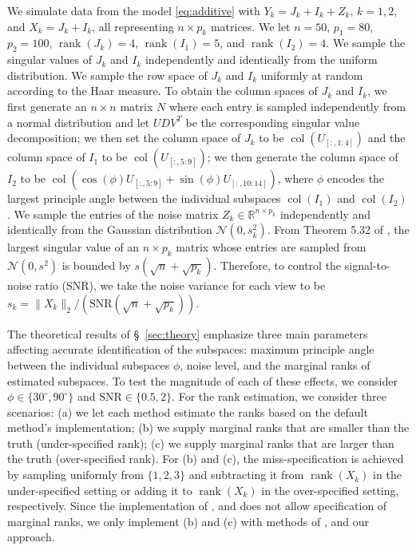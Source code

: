 \documentclass{amsart}
\DeclareMathOperator*{\col}{col}
\DeclareMathOperator*{\rank}{rank}
\newcommand{\Ncal}{\mathcal{N}}
\begin{document}
We simulate data from the model \eqref{eq:additive} with $Y_k = J_k + I_k + Z_k$, $k=1, 2$, and $X_k = J_k + I_k$, all representing $n \times p_k$ matrices. We let $n = 50$, $p_1 = 80$, $p_2 = 100$, $\rank(J_k) = 4$, $\rank(I_1) = 5$, and $\rank(I_2) = 4$. We sample the singular values of $J_k$ and $I_k$ independently and identically from the uniform distribution. We sample the row space of $J_k$ and $I_k$ uniformly at random according to the Haar measure. To obtain the column spaces of $J_k$ and $I_k$, we first generate an $n\times{n}$ matrix $N$ where each entry is sampled independently from a normal distribution and let $UDV^T$ be the corresponding singular value decomposition; we then set the column space of $J_k$  to be $\col(U_{[:,1:4]})$ and the column space of $I_1$ to be $\col(U_{[:,5:9]})$; we then generate the column space of $I_2$ to be $\col(\cos(\phi)U_{[:,5:9]} + \sin(\phi)U_{[:,10:14]})$,  where $\phi$ encodes the largest principle angle between the individual subspaces $\col(I_1)$ and $\col(I_2)$.  We sample the entries of the noise matrix $Z_k \in \mathbb{R}^{n \times p_k}$ independently and identically from the Gaussian distribution $\Ncal(0, s_k^2)$. From Theorem 5.32 of \citet{vershynin2010introduction}, the largest singular value of an $n\times p_k$ matrix whose entries are sampled from $\Ncal(0, s^2)$ is bounded by $s(\sqrt{n} +\sqrt{p_k})$. Therefore, to control the signal-to-noise ratio (SNR), we take the noise variance for each view to be $s_k = \|X_k\|_2/ (\mathrm{SNR}(\sqrt{n} + \sqrt{p_k}))$.  


The theoretical results of \S~\ref{sec:theory} emphasize three main parameters affecting accurate identification of the subspaces: maximum principle angle between the individual subspaces $\phi$, noise level, and the marginal ranks of estimated subspaces. To test the magnitude of each of these effects, we consider $\phi \in \{30^\circ,90^\circ\}$ and $\mathrm{SNR} \in \{0.5,2\}$. For the rank estimation, we consider three scenarios: (a) we let each method estimate the ranks based on the default method's implementation; (b) we supply marginal ranks that are smaller than the truth (under-specified rank); (c) we supply marginal ranks that are larger than the truth (over-specified rank).  For (b) and (c), the miss-specification is achieved by sampling uniformly from $\{1,2,3\}$ and subtracting it from $\rank(X_k)$ in the under-specified setting or adding it to $\rank(X_k)$ in the over-specified setting, respectively. Since the implementation of \citet{lock2013joint}, \citet{gaynanova2019structural} and \citet{park2020integrative} does not allow specification of marginal ranks, we only implement (b) and (c) with methods of \citet{feng2018angle}, \citet{shu2019d} and our approach.
\end{document}
